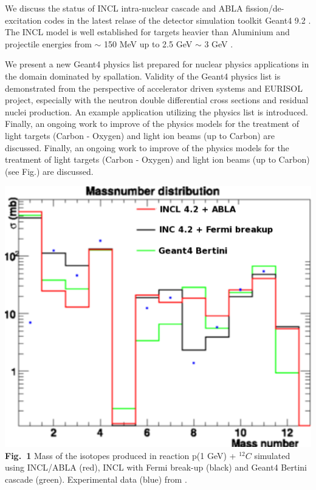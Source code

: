 \documentclass[12pt]{article}
\begin{document}
We discuss the status of INCL intra-nuclear cascade and ABLA fission/de-excitation codes
in the latest relase of the detector simulation toolkit Geant4 9.2 \cite{pk09aCollaboration}.
The INCL model is well established for targets heavier than Aluminium
and projectile energies from $\sim$ 150 MeV up to 2.5 GeV $\sim$ 3 GeV \cite{pk08bProceedings}. 
\begin{minipage}{6cm}
We present a new Geant4 physics list prepared for nuclear physics applications
in the domain dominated by spallation.
Validity of the Geant4 physics list is demonstrated from the perspective of accelerator driven systems
and EURISOL project, especially with the neutron double differential cross sections and residual
nuclei production.
An example application utilizing the physics list is introduced.
%
Finally, an ongoing work to improve of the physics models for the treatment of 
light targets (Carbon - Oxygen) and light ion beams (up to Carbon) are discussed.
Finally, an ongoing work to improve of the physics models for the treatment of 
light targets (Carbon - Oxygen) and light ion beams (up to Carbon) (see Fig.) are discussed.
\end{minipage}
\hfill
\begin{minipage}{9cm}
\includegraphics[scale=0.52]{masses2.eps}
{\bf Fig.~1} Mass of the isotopes produced in reaction p(1 GeV) + $^{12}C$
simulated using INCL/ABLA (red), INCL with Fermi break-up (black) and
Geant4 Bertini cascade (green). Experimental data (blue) from
\cite{carbone}.
\end{minipage}
\end{document}
